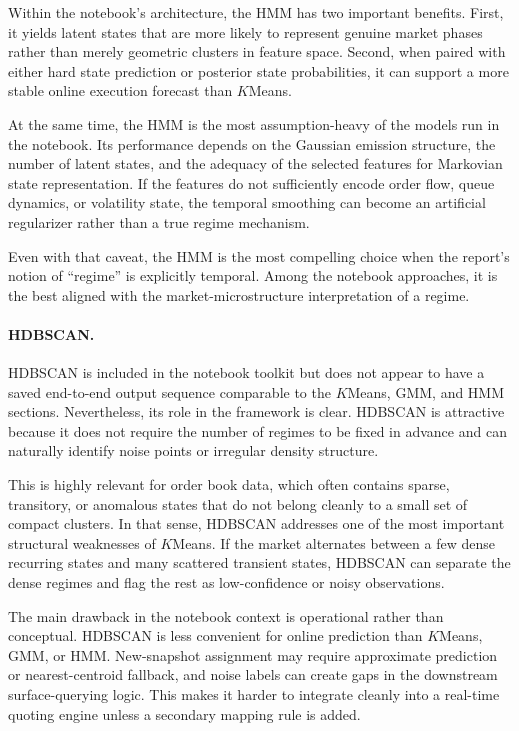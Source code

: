 \documentclass[12pt,a4paper]{report}
\begin{document}
Within the notebook's architecture, the HMM has two important benefits. First, it yields latent states that are more likely to represent genuine market phases rather than merely geometric clusters in feature space. Second, when paired with either hard state prediction or posterior state probabilities, it can support a more stable online execution forecast than $K$Means.

At the same time, the HMM is the most assumption-heavy of the models run in the notebook. Its performance depends on the Gaussian emission structure, the number of latent states, and the adequacy of the selected features for Markovian state representation. If the features do not sufficiently encode order flow, queue dynamics, or volatility state, the temporal smoothing can become an artificial regularizer rather than a true regime mechanism.

Even with that caveat, the HMM is the most compelling choice when the report's notion of ``regime'' is explicitly temporal. Among the notebook approaches, it is the best aligned with the market-microstructure interpretation of a regime.

\paragraph{HDBSCAN.}
HDBSCAN is included in the notebook toolkit but does not appear to have a saved end-to-end output sequence comparable to the $K$Means, GMM, and HMM sections. Nevertheless, its role in the framework is clear. HDBSCAN is attractive because it does not require the number of regimes to be fixed in advance and can naturally identify noise points or irregular density structure.

This is highly relevant for order book data, which often contains sparse, transitory, or anomalous states that do not belong cleanly to a small set of compact clusters. In that sense, HDBSCAN addresses one of the most important structural weaknesses of $K$Means. If the market alternates between a few dense recurring states and many scattered transient states, HDBSCAN can separate the dense regimes and flag the rest as low-confidence or noisy observations.

The main drawback in the notebook context is operational rather than conceptual. HDBSCAN is less convenient for online prediction than $K$Means, GMM, or HMM. New-snapshot assignment may require approximate prediction or nearest-centroid fallback, and noise labels can create gaps in the downstream surface-querying logic. This makes it harder to integrate cleanly into a real-time quoting engine unless a secondary mapping rule is added.
\end{document}
